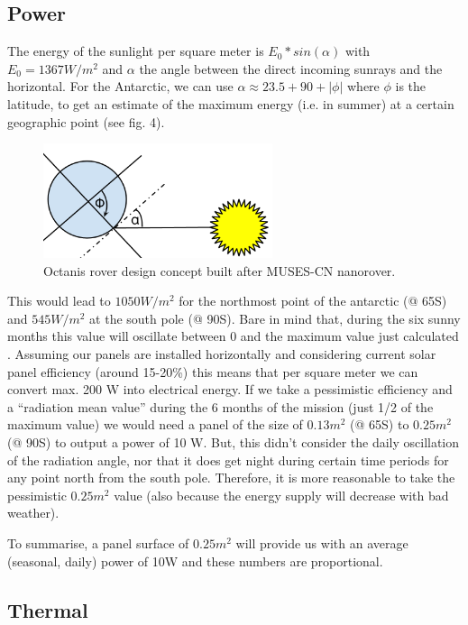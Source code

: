 \documentclass[a4paper,12pt]{article}
\begin{document}
\subsection{Power}

The energy of the sunlight per square meter is $E_0*sin(\alpha)$ with $E_0=1367 W/m^2$ and $\alpha$ the angle between the direct incoming sunrays and the horizontal. For the Antarctic, we can use $\alpha \approx 23.5+90+|\phi|$ where $\phi$ is the latitude, to get an estimate of the maximum energy (i.e. in summer) at a certain geographic point (see fig. 4).


\begin{figure}[h!]
	\centering
    \includegraphics[width=0.6\textwidth]{sun}
    \caption{Octanis rover design concept built after MUSES-CN nanorover.}
\end{figure}


 This would lead to $1050 W/m^2$ for the northmost point of the antarctic (@ 65\degree S) and $545 W/m^2$ at the south pole (@ 90\degree S). Bare in mind that, during the six sunny months this value will oscillate between 0 and the maximum value just calculated \cite{pvedu}. 
Assuming our panels are installed horizontally and considering current solar panel efficiency (around 15-20\%) this means that per square meter we can convert max. 200 W into electrical energy. If we take a pessimistic efficiency and a “radiation mean value” during the 6 months of the mission (just 1/2 of the maximum value) we would need a panel of the size of $0.13m^2$ (@ 65\degree S) to $0.25m^2$ (@ 90\degree S) to output a power of 10 W. But, this didn’t consider the daily oscillation of the radiation angle, nor that it does get night during certain time periods for any point north from the south pole. Therefore, it is more reasonable to take the pessimistic $0.25m^2$ value (also because the energy supply will decrease with bad weather).

To summarise, a panel surface of $0.25m^2$ will provide us with an average (seasonal, daily) power of 10W and these numbers are proportional. 


\subsection{Thermal}
\end{document}
